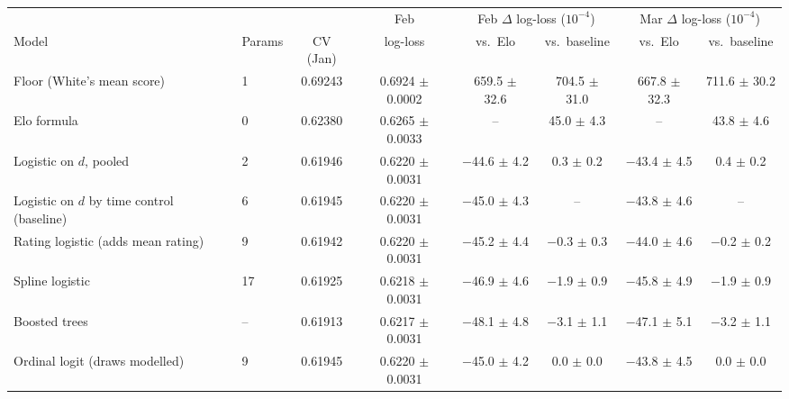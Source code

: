 \begin{tabular}{llcccccc}
\toprule
 & & & Feb & \multicolumn{2}{c}{Feb $\Delta$ log-loss ($10^{-4}$)} & \multicolumn{2}{c}{Mar $\Delta$ log-loss ($10^{-4}$)} \\
\cmidrule(lr){5-6}\cmidrule(lr){7-8}
Model & Params & CV (Jan) & log-loss & vs.\ Elo & vs.\ baseline & vs.\ Elo & vs.\ baseline \\
\midrule
Floor (White's mean score) & 1 & 0.69243 & 0.6924 $\pm$ 0.0002 & 659.5 $\pm$ 32.6 & 704.5 $\pm$ 31.0 & 667.8 $\pm$ 32.3 & 711.6 $\pm$ 30.2 \\
Elo formula & 0 & 0.62380 & 0.6265 $\pm$ 0.0033 & -- & 45.0 $\pm$ 4.3 & -- & 43.8 $\pm$ 4.6 \\
Logistic on $d$, pooled & 2 & 0.61946 & 0.6220 $\pm$ 0.0031 & $-$44.6 $\pm$ 4.2 & 0.3 $\pm$ 0.2 & $-$43.4 $\pm$ 4.5 & 0.4 $\pm$ 0.2 \\
Logistic on $d$ by time control (baseline) & 6 & 0.61945 & 0.6220 $\pm$ 0.0031 & $-$45.0 $\pm$ 4.3 & -- & $-$43.8 $\pm$ 4.6 & -- \\
Rating logistic (adds mean rating) & 9 & 0.61942 & 0.6220 $\pm$ 0.0031 & $-$45.2 $\pm$ 4.4 & $-$0.3 $\pm$ 0.3 & $-$44.0 $\pm$ 4.6 & $-$0.2 $\pm$ 0.2 \\
Spline logistic & 17 & 0.61925 & 0.6218 $\pm$ 0.0031 & $-$46.9 $\pm$ 4.6 & $-$1.9 $\pm$ 0.9 & $-$45.8 $\pm$ 4.9 & $-$1.9 $\pm$ 0.9 \\
Boosted trees & -- & 0.61913 & 0.6217 $\pm$ 0.0031 & $-$48.1 $\pm$ 4.8 & $-$3.1 $\pm$ 1.1 & $-$47.1 $\pm$ 5.1 & $-$3.2 $\pm$ 1.1 \\
Ordinal logit (draws modelled) & 9 & 0.61945 & 0.6220 $\pm$ 0.0031 & $-$45.0 $\pm$ 4.2 & 0.0 $\pm$ 0.0 & $-$43.8 $\pm$ 4.5 & 0.0 $\pm$ 0.0 \\
\bottomrule
\end{tabular}
